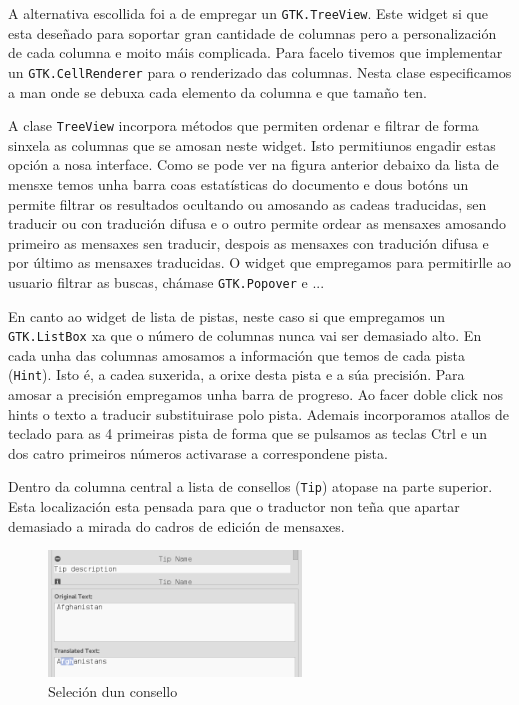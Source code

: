 A alternativa escollida foi a de empregar un \lstinline{GTK.TreeView}. Este widget si que esta deseñado para soportar gran cantidade de columnas pero a personalización de cada columna e moito máis complicada. Para facelo tivemos que implementar un \lstinline{GTK.CellRenderer} para o renderizado das columnas. Nesta clase especificamos a man onde se debuxa cada elemento da columna e que tamaño ten.

A clase \lstinline{TreeView} incorpora métodos que permiten ordenar e filtrar de forma sinxela as columnas que se amosan neste widget. Isto permitiunos engadir estas opción a nosa interface. Como se pode ver na figura anterior debaixo da lista de mensxe temos unha barra coas estatísticas do documento e dous botóns un permite filtrar os resultados ocultando ou amosando as cadeas traducidas, sen traducir ou con tradución difusa e o outro permite ordear as mensaxes amosando primeiro as mensaxes sen traducir, despois as mensaxes con tradución difusa e por último as mensaxes traducidas. O widget que empregamos para permitirlle ao usuario filtrar as buscas, chámase \lstinline{GTK.Popover} e ...

En canto ao widget de lista de pistas, neste caso si que empregamos un \lstinline{GTK.ListBox} xa que o número de columnas nunca vai ser demasiado alto. En cada unha das columnas amosamos a información que temos de cada pista (\lstinline{Hint}). Isto é, a cadea suxerida, a orixe desta pista e a súa precisión. Para amosar a precisión empregamos unha barra de progreso. Ao facer doble click nos hints o texto a traducir substituirase polo pista. Ademais incorporamos atallos de teclado para as 4 primeiras pista de forma que se pulsamos as teclas Ctrl e un dos catro primeiros números activarase a correspondene pista.

Dentro da columna central a lista de consellos (\lstinline{Tip}) atopase na parte superior. Esta localización esta pensada para que o traductor non teña que apartar demasiado a mirada do cadros de edición de mensaxes.

\begin{figure}[h!]
    \centering
    \includegraphics[width=0.6\textwidth]{img/selectedtip.png}
    \caption{Seleción dun consello}
    \label{fig:ui:panel:edit:selectedtip}
\end{figure}

